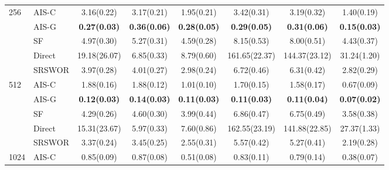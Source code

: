 \begin{tabular}{llcccccc}
  \midrule
  \multirow{5}{*}{256}   & AIS-C                 & {3.16(0.22)}          & {3.17(0.21)}          & {1.95(0.21)}          & {3.42(0.31)}          & {3.19(0.32)}          & {1.40(0.19)}          \\
                         & AIS-G                 & \textbf{0.27(0.03)}   & \textbf{0.36(0.06)}   & \textbf{0.28(0.05)}   & \textbf{0.29(0.05)}   & \textbf{0.31(0.06)}   & \textbf{0.15(0.03)}   \\
                         & SF                    & {4.97(0.30)}          & {5.27(0.31)}          & {4.59(0.28)}          & {8.15(0.53)}          & {8.00(0.51)}          & {4.43(0.37)}          \\
                         & Direct                & {19.18(26.07)}        & {6.85(0.33)}          & {8.79(0.60)}          & {161.65(22.37)}       & {144.37(23.12)}       & {31.24(1.20)}         \\
                         & SRSWOR                & {3.97(0.28)}          & {4.01(0.27)}          & {2.98(0.24)}          & {6.72(0.46)}          & {6.31(0.42)}          & {2.82(0.29)}          \\
  \midrule
  \multirow{5}{*}{512}   & AIS-C                 & {1.88(0.16)}          & {1.88(0.12)}          & {1.01(0.10)}          & {1.70(0.15)}          & {1.58(0.17)}          & {0.67(0.09)}          \\
                         & AIS-G                 & \textbf{0.12(0.03)}   & \textbf{0.14(0.03)}   & \textbf{0.11(0.03)}   & \textbf{0.11(0.03)}   & \textbf{0.11(0.04)}   & \textbf{0.07(0.02)}   \\
                         & SF                    & {4.29(0.26)}          & {4.60(0.30)}          & {3.99(0.44)}          & {6.86(0.47)}          & {6.75(0.49)}          & {3.58(0.38)}          \\
                         & Direct                & {15.31(23.67)}        & {5.97(0.33)}          & {7.60(0.86)}          & {162.55(23.19)}       & {141.88(22.85)}       & {27.37(1.33)}         \\
                         & SRSWOR                & {3.37(0.24)}          & {3.45(0.25)}          & {2.55(0.31)}          & {5.57(0.42)}          & {5.27(0.41)}          & {2.19(0.28)}          \\
  \midrule
  \multirow{5}{*}{1024}  & AIS-C                 & {0.85(0.09)}          & {0.87(0.08)}          & {0.51(0.08)}          & {0.83(0.11)}          & {0.79(0.14)}          & {0.38(0.07)}          \\

\end{tabular}
